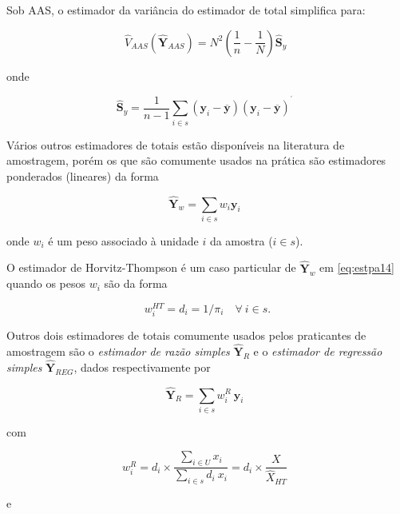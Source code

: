 \documentclass[
  12pt,
  brazilian,
]{book}
\theoremstyle{definition}
\theoremstyle{definition}
\theoremstyle{definition}
\theoremstyle{definition}
\theoremstyle{remark}
\begin{document}
Sob AAS, o estimador da variância do estimador de total simplifica para:

\begin{equation}
\widehat{V}_{AAS} \left( \mathbf{\widehat{Y}}_{AAS} \right) = N^{2} \left( \frac{1}{n} - \frac{1}{N} \right) \mathbf{\widehat S}_y \,\, \label{eq:estpa12}
\end{equation}

onde

\begin{equation}
\widehat{\mathbf{S}}_y = \frac{1}{n-1} \sum_{i \in s} \left( \mathbf{y}_i - \overline{\mathbf{y}} \right) \left( \mathbf{y}_i - \overline{\mathbf{y}} \right) ^{^{\prime }} \,\,\, \label{eq:estpa13} 
\end{equation}

Vários outros estimadores de totais estão disponíveis na literatura de amostragem, porém os que são comumente usados na prática são estimadores ponderados (lineares) da forma

\begin{equation}
\mathbf{\widehat{Y}}_w = \sum\limits_{i \in s} w_i \mathbf{y}_i  \,\,\, \label{eq:estpa14}
\end{equation}

onde \(w_i\) é um peso associado à unidade \(i\) da amostra (\(i \in s\)).

O estimador de Horvitz-Thompson é um caso particular de \(\mathbf{\widehat{Y}}_w\) em \eqref{eq:estpa14} quando os pesos \(w_i\) são da forma

\[
w_i^{HT} = d_i = 1 / \pi_i \quad \forall \ i \in s. 
\]

Outros dois estimadores de totais comumente usados pelos praticantes de amostragem são o \emph{estimador de razão simples} \(\mathbf{\widehat{Y}}_R\) e o \emph{estimador de regressão simples} \(\mathbf{\widehat{Y}}_{REG}\), dados respectivamente por

\begin{equation}
\mathbf{\widehat{Y}}_R = \sum_{i \in s} {w_i^{R} \ } \mathbf{y}_i \,\,\,  \label{eq:estpa15}
\end{equation}

com

\begin{equation}
w_i^{R} = d_i \times \frac{\sum_{i \in U} x_i } {\sum_{i \in s} {d_i \ } x_i} = d_i \times \frac{X}{\widehat{X}_{HT}}  \,\,\,  \label{eq:estpa16}
\end{equation}

e
\end{document}
